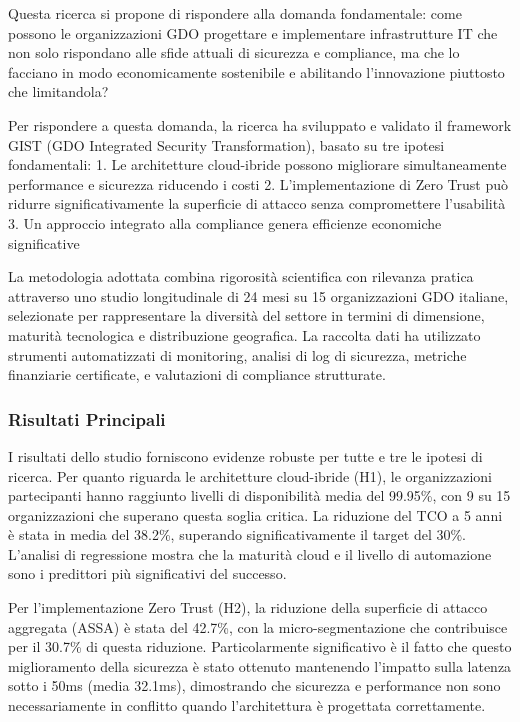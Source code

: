 \documentclass{report}
\begin{document}
Questa ricerca si propone di rispondere alla domanda fondamentale: come
possono le organizzazioni GDO progettare e implementare infrastrutture
IT che non solo rispondano alle sfide attuali di sicurezza e compliance,
ma che lo facciano in modo economicamente sostenibile e abilitando
l'innovazione piuttosto che limitandola?

Per rispondere a questa domanda, la ricerca ha sviluppato e validato il
framework GIST (GDO Integrated Security Transformation), basato su tre
ipotesi fondamentali: 1. Le architetture cloud-ibride possono migliorare
simultaneamente performance e sicurezza riducendo i costi 2.
L'implementazione di Zero Trust può ridurre significativamente la
superficie di attacco senza compromettere l'usabilità 3. Un approccio
integrato alla compliance genera efficienze economiche significative

La metodologia adottata combina rigorosità scientifica con rilevanza
pratica attraverso uno studio longitudinale di 24 mesi su 15
organizzazioni GDO italiane, selezionate per rappresentare la diversità
del settore in termini di dimensione, maturità tecnologica e
distribuzione geografica. La raccolta dati ha utilizzato strumenti
automatizzati di monitoring, analisi di log di sicurezza, metriche
finanziarie certificate, e valutazioni di compliance strutturate.

\subsubsection{Risultati Principali}\label{risultati-principali}

I risultati dello studio forniscono evidenze robuste per tutte e tre le
ipotesi di ricerca. Per quanto riguarda le architetture cloud-ibride
(H1), le organizzazioni partecipanti hanno raggiunto livelli di
disponibilità media del 99.95\%, con 9 su 15 organizzazioni che superano
questa soglia critica. La riduzione del TCO a 5 anni è stata in media
del 38.2\%, superando significativamente il target del 30\%. L'analisi
di regressione mostra che la maturità cloud e il livello di automazione
sono i predittori più significativi del successo.

Per l'implementazione Zero Trust (H2), la riduzione della superficie di
attacco aggregata (ASSA) è stata del 42.7\%, con la micro-segmentazione
che contribuisce per il 30.7\% di questa riduzione. Particolarmente
significativo è il fatto che questo miglioramento della sicurezza è
stato ottenuto mantenendo l'impatto sulla latenza sotto i 50ms (media
32.1ms), dimostrando che sicurezza e performance non sono
necessariamente in conflitto quando l'architettura è progettata
correttamente.
\end{document}
